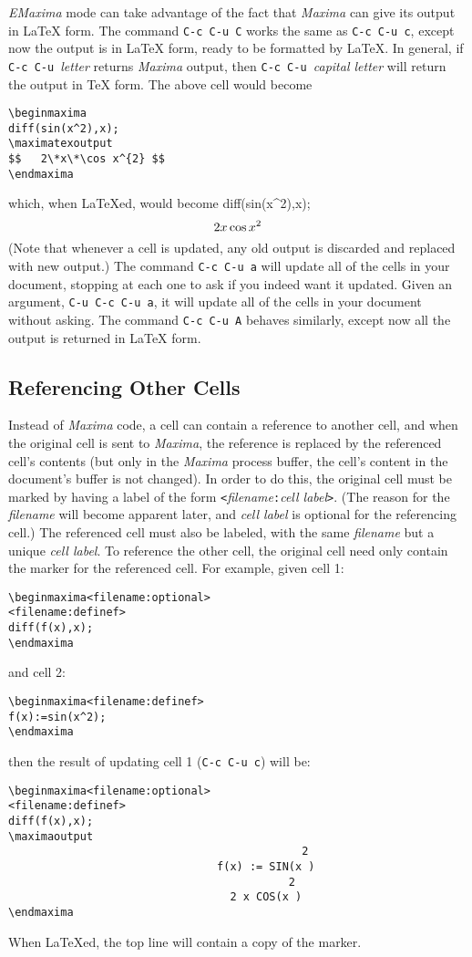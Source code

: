 \documentclass{article}
\newcommand{\emx}{\textsl{\sffamily EMaxima}}
\newcommand{\mx}{\textsl{\sffamily Maxima}}
\begin{document}
\emx{} mode can take advantage of the fact that \mx{} can give its
output in \LaTeX{} form.  The command \texttt{C-c C-u C}
works the same as \texttt{C-c C-u c}, except now the output is in \LaTeX{}
form, ready to be formatted by \LaTeX{}.  In general, if 
\texttt{C-c C-u }\textsl{letter} returns \mx{} output, then
\texttt{C-c C-u }\textsl{capital letter} will return the output in
\TeX{} form.  The above cell would become
\begin{verbatim}
\beginmaxima
diff(sin(x^2),x);
\maximatexoutput
$$   2\*x\*\cos x^{2} $$
\endmaxima
\end{verbatim}
\noindent
which, when \LaTeX{}ed, would become
\beginmaxima
diff(sin(x^2),x);
\maximatexoutput
\[   2\*x\*\cos x^{2} \]
\endmaxima
\noindent
(Note that whenever a cell is updated, any old output is discarded and
replaced with new output.)  The command \texttt{C-c C-u a} will update all
of the cells in your document, 
stopping at each one to ask if you indeed want it updated.  Given an
argument, \texttt{C-u C-c C-u a}, it will update all of the cells in your
document without asking.  The command \texttt{C-c C-u A} behaves
similarly, except now all the output is returned in \LaTeX{}  form.

\subsection{Referencing Other Cells}

\noindent
Instead of \mx{} code, a cell can contain a reference to another cell,
and when the original cell is sent to \mx{}, the reference is replaced
by the referenced cell's contents (but only in the \mx{} process
buffer, the cell's 
content in the document's buffer is not changed).  In order to do
this, the original cell must be marked by having a label of the form
\texttt{<}\textsl{filename}\texttt{:}\textsl{cell label}\texttt{>}.
(The reason for the \textsl{filename} will become apparent later, and
\textsl{cell label} is optional for the referencing cell.)
The referenced cell must also be labeled, with the same
\textsl{filename} but a unique \textsl{cell label}.  To reference the
other cell, the original cell need only contain the marker for the
referenced cell.  For example, given cell 1:
\begin{verbatim}
\beginmaxima<filename:optional>
<filename:definef>
diff(f(x),x);
\endmaxima
\end{verbatim}
\noindent
and cell 2:
\begin{verbatim}
\beginmaxima<filename:definef>
f(x):=sin(x^2);
\endmaxima
\end{verbatim}
\noindent
then the result of updating cell 1 (\texttt{C-c C-u c}) will be:
\begin{verbatim}
\beginmaxima<filename:optional>
<filename:definef>
diff(f(x),x);
\maximaoutput
                                             2
                                f(x) := SIN(x )
                                           2
                                  2 x COS(x )
\endmaxima
\end{verbatim}
\noindent
When \LaTeX{}ed, the top line will contain a copy of the marker.
\end{document}
